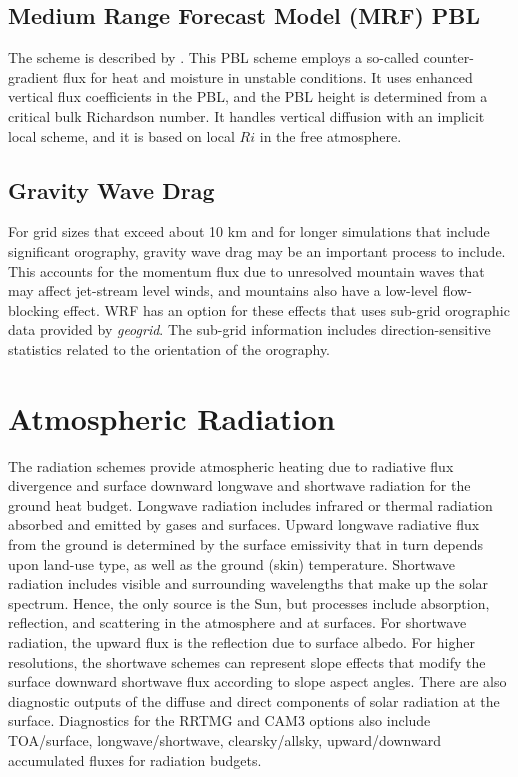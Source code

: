 \subsection {Medium Range Forecast Model (MRF) PBL}

The scheme is described by \citet{hong96}. 
This PBL scheme employs a so-called counter-gradient flux for heat and moisture 
in unstable conditions. It uses enhanced vertical flux coefficients in the PBL, 
and the PBL height is determined from a critical bulk Richardson number. 
It handles vertical diffusion with an implicit local scheme, and it is based 
on local $Ri$ in the free atmosphere.

\subsection {Gravity Wave Drag}

For grid sizes that exceed about 10 km and for longer simulations that include significant orography,
gravity wave drag may be an important process to include. This accounts for the momentum flux
due to unresolved mountain waves that may affect jet-stream level winds, and mountains also
have a low-level flow-blocking effect. WRF has an option for these effects \citep{choi15} that uses
sub-grid orographic data provided by {\em geogrid}. The sub-grid information includes direction-sensitive
statistics related to the orientation of the orography.


\section{Atmospheric Radiation}

The radiation schemes provide atmospheric heating due to radiative 
flux divergence and surface downward longwave and shortwave 
radiation for the ground heat budget. Longwave radiation includes 
infrared or thermal radiation absorbed and emitted by gases and surfaces. 
Upward longwave radiative flux from the ground is determined by the surface 
emissivity that in turn depends upon land-use type, as well as the ground (skin) 
temperature. Shortwave radiation includes visible and surrounding wavelengths 
that make up the solar spectrum. Hence, the only source is the Sun, but 
processes include absorption, reflection, and scattering in the atmosphere 
and at surfaces. For shortwave radiation, the upward flux is the reflection due to surface 
albedo. For higher resolutions, the shortwave schemes can represent slope effects
that modify the surface downward shortwave flux according to slope aspect angles.
There are also diagnostic outputs of the diffuse and direct components of solar radiation
at the surface. Diagnostics for the RRTMG and CAM3 options also include
TOA/surface, longwave/shortwave, clearsky/allsky, upward/downward  accumulated
fluxes for radiation budgets.

